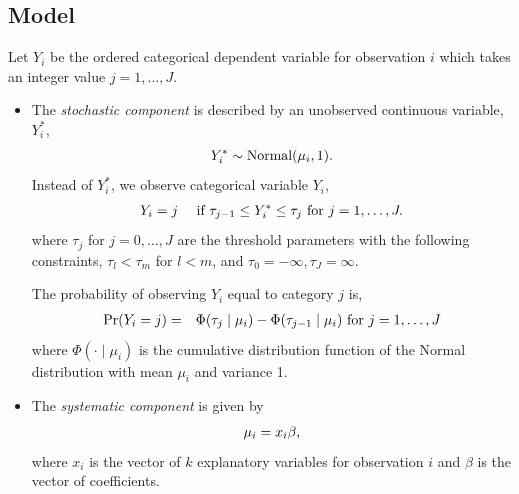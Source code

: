 \documentclass[letterpaper,10pt,english]{sphinxmanual}
\begin{document}
\subsection{Model}
\label{vignette:id95}
Let \(Y_{i}\) be the ordered categorical dependent variable for
observation \(i\) which takes an integer value
\(j=1, \ldots, J\).
\begin{itemize}
\item {} 
The \emph{stochastic component} is described by an unobserved continuous
variable, \(Y_i^*\),
\begin{gather}
\begin{split}\begin{aligned}
Y_{i}^*  \sim \textrm{Normal}(\mu_i, 1).\end{aligned}\end{split}\notag
\end{gather}
Instead of \(Y_i^*\), we observe categorical variable
\(Y_i\),
\begin{gather}
\begin{split}\begin{aligned}
Y_i = j \quad \textrm{ if } \tau_{j-1} \le Y_i^* \le \tau_j \textrm{
for } j=1,\ldots, J.\end{aligned}\end{split}\notag
\end{gather}
where \(\tau_j\) for \(j=0,\ldots, J\) are the threshold
parameters with the following constraints, \(\tau_l < \tau_m\)
for \(l < m\), and \(\tau_0=-\infty, \tau_J=\infty\).

The probability of observing \(Y_i\) equal to category \(j\)
is,
\begin{gather}
\begin{split}\begin{aligned}
\Pr(Y_i=j) &=& \Phi(\tau_j \mid \mu_i)-\Phi(\tau_{j-1} \mid \mu_i)
\textrm{ for } j=1,\ldots, J\end{aligned}\end{split}\notag
\end{gather}
where \(\Phi(\cdot \mid \mu_i)\) is the cumulative distribution
function of the Normal distribution with mean \(\mu_i\) and
variance 1.

\item {} 
The \emph{systematic component} is given by
\begin{gather}
\begin{split}\begin{aligned}
\mu_{i}= x_i \beta,\end{aligned}\end{split}\notag
\end{gather}
where \(x_{i}\) is the vector of \(k\) explanatory variables
for observation \(i\) and \(\beta\) is the vector of
coefficients.


\end{itemize}
\end{document}
